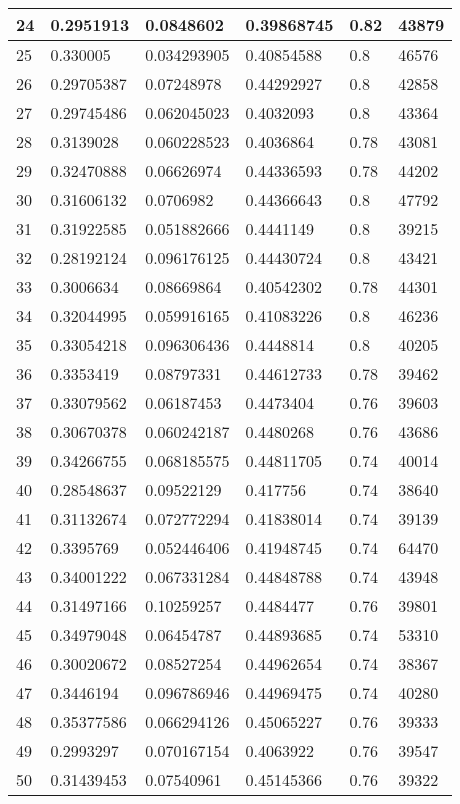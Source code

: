 \begin{longtable}{|l|l|l|l|l|l|}
24 & 0.2951913 & 0.0848602 & 0.39868745 & 0.82 & 43879 \\ \hline 
25 & 0.330005 & 0.034293905 & 0.40854588 & 0.8 & 46576 \\ \hline 
26 & 0.29705387 & 0.07248978 & 0.44292927 & 0.8 & 42858 \\ \hline 
27 & 0.29745486 & 0.062045023 & 0.4032093 & 0.8 & 43364 \\ \hline 
28 & 0.3139028 & 0.060228523 & 0.4036864 & 0.78 & 43081 \\ \hline 
29 & 0.32470888 & 0.06626974 & 0.44336593 & 0.78 & 44202 \\ \hline 
30 & 0.31606132 & 0.0706982 & 0.44366643 & 0.8 & 47792 \\ \hline 
31 & 0.31922585 & 0.051882666 & 0.4441149 & 0.8 & 39215 \\ \hline 
32 & 0.28192124 & 0.096176125 & 0.44430724 & 0.8 & 43421 \\ \hline 
33 & 0.3006634 & 0.08669864 & 0.40542302 & 0.78 & 44301 \\ \hline 
34 & 0.32044995 & 0.059916165 & 0.41083226 & 0.8 & 46236 \\ \hline 
35 & 0.33054218 & 0.096306436 & 0.4448814 & 0.8 & 40205 \\ \hline 
36 & 0.3353419 & 0.08797331 & 0.44612733 & 0.78 & 39462 \\ \hline 
37 & 0.33079562 & 0.06187453 & 0.4473404 & 0.76 & 39603 \\ \hline 
38 & 0.30670378 & 0.060242187 & 0.4480268 & 0.76 & 43686 \\ \hline 
39 & 0.34266755 & 0.068185575 & 0.44811705 & 0.74 & 40014 \\ \hline 
40 & 0.28548637 & 0.09522129 & 0.417756 & 0.74 & 38640 \\ \hline 
41 & 0.31132674 & 0.072772294 & 0.41838014 & 0.74 & 39139 \\ \hline 
42 & 0.3395769 & 0.052446406 & 0.41948745 & 0.74 & 64470 \\ \hline 
43 & 0.34001222 & 0.067331284 & 0.44848788 & 0.74 & 43948 \\ \hline 
44 & 0.31497166 & 0.10259257 & 0.4484477 & 0.76 & 39801 \\ \hline 
45 & 0.34979048 & 0.06454787 & 0.44893685 & 0.74 & 53310 \\ \hline 
46 & 0.30020672 & 0.08527254 & 0.44962654 & 0.74 & 38367 \\ \hline 
47 & 0.3446194 & 0.096786946 & 0.44969475 & 0.74 & 40280 \\ \hline 
48 & 0.35377586 & 0.066294126 & 0.45065227 & 0.76 & 39333 \\ \hline 
49 & 0.2993297 & 0.070167154 & 0.4063922 & 0.76 & 39547 \\ \hline 
50 & 0.31439453 & 0.07540961 & 0.45145366 & 0.76 & 39322 \\ \hline 
\end{longtable}